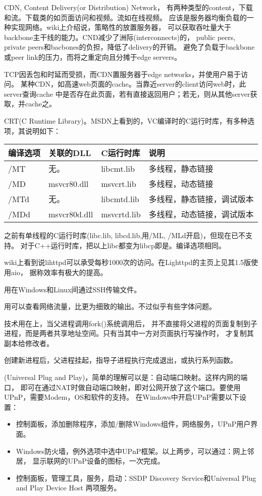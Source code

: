 CDN, Content Delivery(or Distribution) Network，
有两种类型的content，下载和流。下载类的如页面访问和视频。流如在线视频。
应该是服务器均衡负载的一种实现网络。wiki上介绍说，策略性的放置服务器，
可以获取吞吐量大于backbone主干线的能力。CND减少了洲际(interconnects)的，
public peers, private peers和bacbones的负担，降低了delivery的开销。
避免了负载于backbone或peer link的压力，而将之重定向且分摊于edge servers。

TCP因丢包和时延而受损，而CDN置服务器于edge networks，并使用户易于访问。
某种CDN，如高速web页面的cache。当靠近server的client访问web时，此server查询cache
中是否存在此页面，若有直接返回用户；若无，则从其他server获取，并cache之。

CRT(C Runtime Library)。MSDN上看到的，VC编译时的C运行时库，有多种选项，其说明如下：\\
\begin{tabular}{|l|l|l|l|}\hline
编译选项    & 关联的DLL     & C运行时库         & 说明  \\\hline
/MT         & 无。          & libcmt.lib        & 多线程，静态链接 \\\hline
/MD         & msvcr80.dll   & msvcrt.lib        & 多线程，动态链接 \\\hline
/MTd        & 无。          & libcmtd.lib       & 多线程，静态链接，调试版本 \\\hline
/MDd        & msvcr80d.dll  & msvcrtd.lib       & 多线程，动态链接，调试版本 \\\hline
\end{tabular}

之前有单线程的C运行时库(libc.lib, libcd.lib,用/ML, /MLd开启)，但现在已不支持。
对于C++运行时库，把以上libc都变为libcp即是。编译选项相同。

wiki上看到说lihttpd可以承受每秒1000次的访问。在Lighttpd的主页上见其1.5版使用aio，
据称效率有极大的提高。

用在Windows和Linux间通过SSH传输文件。

用可以查看网络流量，比更为细致的输出。不过似乎有些字体问题。

技术用在上，当父进程调用fork()系统调用后，
并不直接将父进程的页面复制到子进程，而是两者共享地址空间。只有当其中一方对页面执行写操作时，
才复制其副本给修改者。

创建新进程后，父进程挂起，指导子进程执行完成退出，或执行系列函数。

(Universal Plug and Play)，简单的理解可以是：自动端口映射。这样内网的端口，
即可在通过NAT时做自动端口映射，即对公网开放了这个端口。要使用UPnP，需要Modem，OS和软件的支持。
在Windows中开启UPnP需要以下设置：
\begin{itemize}
\item 控制面板，添加删除程序，添加/删除Windows组件，网络服务，UPnP用户界面。
\item Windows防火墙，例外选项中选中UPnP框架。以上两步，可以通过：网上邻居，
显示联网的UPnP设备的图标，一次完成。
\item 控制面板，管理工具，服务，启动：SSDP Discovery Service和Universal Plug and Play Device Host
两项服务。
\end{itemize}

